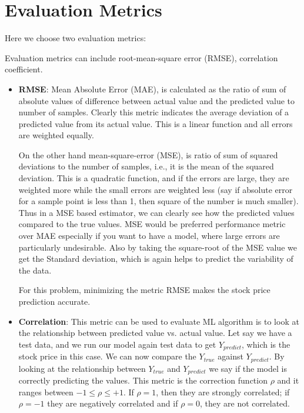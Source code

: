 \documentclass[12pt]{article}
\begin{document}
\section{Evaluation Metrics}
\label{sec:metrics}

Here we choose two evaluation metrics:

Evaluation metrics can include root-mean-square error (RMSE), correlation coefficient. 

\begin{itemize}

\item {\bf RMSE}:  Mean Absolute Error (MAE), is calculated as the ratio of sum of absolute values of difference between actual value and the predicted value to number of samples. Clearly this metric indicates the average deviation of a predicted value from its actual value. This is a linear function and all errors are weighted equally.

On the other hand mean-square-error (MSE), is ratio of sum of squared deviations to the number of samples, i.e., it is the mean of the squared deviation. This is a quadratic function, and if the errors are large, they are weighted more while the small errors are weighted less (say if absolute error for a sample point is less than 1, then square of the number is much smaller). Thus in a MSE based estimator, we can clearly see how the predicted values compared to the true values. MSE would be preferred performance metric over MAE especially if you want to have a model, where large errors are particularly undesirable.  Also by taking the square-root of the MSE value we get the Standard deviation, which is again helps to predict the variability of the data. 

For this problem, minimizing the metric RMSE makes the stock price prediction accurate.

\item {\bf Correlation}: This metric can be used to evaluate ML algorithm is to look at the relationship between predicted value vs. actual value. Let say we have a test data, and we run our model again test data to get $Y_{predict}$, which is the stock price in this case. We can now compare the $Y_{true}$ against $Y_{predict}$. By looking at the relationship between  $Y_{true}$ and $Y_{predict}$ we say if the model is correctly predicting the values. This metric is the correction function $\rho$ and it ranges between $-1 \leq \rho \leq +1$. If $\rho=1$, then they are strongly correlated; if $\rho=-1$ they are negatively correlated and if $\rho=0$, they are not correlated. 

\end{itemize}
\end{document}
